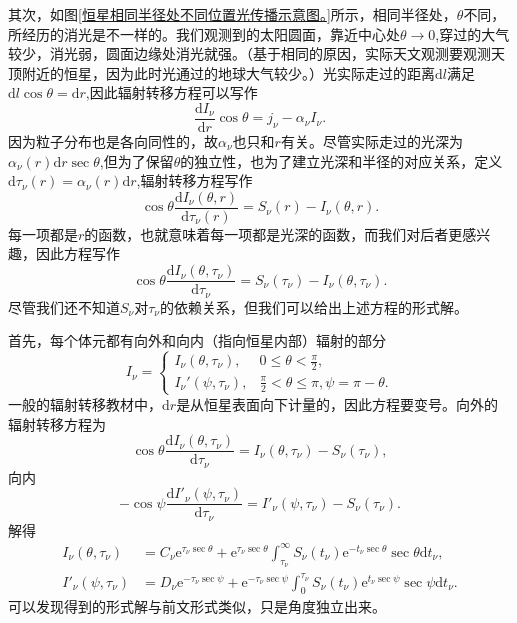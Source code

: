 \documentclass[../天体物理基础.tex]{subfiles}
\begin{document}
其次，如图\ref{恒星相同半径处不同位置光传播示意图。}所示，相同半径处，$\theta$不同，所经历的消光是不一样的。我们观测到的太阳圆面，靠近中心处$\theta\to0$,穿过的大气较少，消光弱，圆面边缘处消光就强。（基于相同的原因，实际天文观测要观测天顶附近的恒星，因为此时光通过的地球大气较少。）光实际走过的距离$\mathrm{d}l$满足$\mathrm{d}l\cos\theta=\mathrm{d}r$,因此辐射转移方程可以写作
\begin{equation}
\frac{\mathrm{d}I_{\nu}}{\mathrm{d}r}\cos\theta=j_{\nu}-\alpha_{\nu}I_{\nu}.
\end{equation}
因为粒子分布也是各向同性的，故$\alpha_{\nu}$也只和$r$有关。尽管实际走过的光深为$\alpha_{\nu}\left(r\right)\mathrm{d}r\sec\theta$,但为了保留$\theta$的独立性，也为了建立光深和半径的对应关系，定义$\mathrm{d}\tau_{\nu}\left(r\right)=\alpha_{\nu}\left(r\right)\mathrm{d}r$,辐射转移方程写作
\begin{equation}
\cos\theta\frac{\mathrm{d}I_{\nu}\left(\theta,r\right)}{\mathrm{d}\tau_{\nu}\left(r\right)}=S_{\nu}\left(r\right)-I_{\nu}\left(\theta,r\right).
\end{equation}
每一项都是$r$的函数，也就意味着每一项都是光深的函数，而我们对后者更感兴趣，因此方程写作
\begin{equation}
\cos\theta\frac{\mathrm{d}I_{\nu}\left(\theta,\tau_{\nu}\right)}{\mathrm{d}\tau_{\nu}}=S_{\nu}\left(\tau_{\nu}\right)-I_{\nu}\left(\theta,\tau_{\nu}\right).
\end{equation}
尽管我们还不知道$S_{\nu}$对$\tau_{\nu}$的依赖关系，但我们可以给出上述方程的形式解。

首先，每个体元都有向外和向内（指向恒星内部）辐射的部分
\begin{equation}
I_\nu=\begin{cases}
I_\nu(\theta,\tau_\nu), & 0\le\theta<\frac{\pi}{2},\\
I_\nu'(\psi,\tau_\nu), & \frac{\pi}2<\theta\le\pi,\psi=\pi-\theta.
\end{cases}
\end{equation}
一般的辐射转移教材中，$\mathrm{d}r$是从恒星表面向下计量的，因此方程要变号。向外的辐射转移方程为
\begin{equation}
\cos\theta\frac{\mathrm{d}I_\nu(\theta,\tau_\nu)}{\mathrm{d}\tau_\nu}=I_\nu(\theta,\tau_\nu)-S_\nu(\tau_\nu),
\end{equation}
向内
\begin{equation}
-\cos\psi\frac{\mathrm{d}I'_\nu(\psi,\tau_\nu)}{\mathrm{d}\tau_\nu}=I'_\nu(\psi,\tau_\nu)-S_\nu(\tau_\nu).
\end{equation}
解得
\begin{align}
I_\nu(\theta,\tau_\nu)&=C_\nu\mathrm{e}^{\tau_\nu\sec\theta}+\mathrm{e}^{\tau_\nu\sec\theta}\int_{\tau_\nu}^\infty S_\nu(t_\nu)\mathrm{e}^{-t_\nu\sec\theta}\sec\theta\mathrm{d}t_\nu,\\
I'_\nu(\psi,\tau_\nu)&=D_\nu\mathrm{e}^{-\tau_\nu\sec\psi}+\mathrm{e}^{-\tau_\nu\sec\psi}\int_{0}^{\tau_\nu} S_\nu(t_\nu)\mathrm{e}^{t_\nu\sec\psi}\sec\psi\mathrm{d}t_\nu.
\end{align}
可以发现得到的形式解与前文形式类似，只是角度独立出来。
\end{document}
